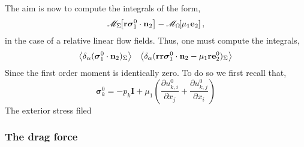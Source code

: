The aim is now to compute the integrals of the form, 
\begin{align*}    
    \mathscr{M}_\Sigma\!\!\left[\textbf{r}\bm{\sigma}_1^0\cdot \textbf{n}_2\right]
    - \mathscr{M}_\Omega\!\!\left[\mu_1 \textbf{e}_2 \right],
\end{align*}
in the case of a relative linear flow fields. 
Thus, one must compute the integrals, 
\begin{align*}
    \left<\delta_\alpha ( \bm\sigma_1^0\cdot \textbf{n}_2 )_{\Sigma}\right>
    &&
    \left<\delta_\alpha ( \textbf{rr}\bm\sigma_1^0\cdot \textbf{n}_2 - \mu_1 \textbf{r}\textbf{e}_2^0 )_{\Sigma}\right>
\end{align*}
Since the first order moment is identically zero. 
To do so we first recall that, 
\begin{equation}
    \bm\sigma_k^0
    = 
    - p_k \textbf{I}
    + \mu_1 \left(
        \frac{\partial u_{k,i}^0}{\partial x_j}
        + \frac{\partial u_{k,j}^0}{\partial x_i}
    \right)
\end{equation}
The exterior stress filed

\subsubsection*{The drag force}
